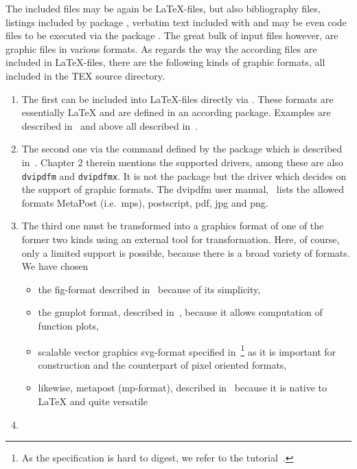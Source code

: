 The included files may be again be \LaTeX-files, but also bibliography files, 
listings included by package , verbatim text included with  
and may be even code files to be executed via the package . 
The great bulk of input files however, are graphic files in various formats. 
As regards the way the according files are included in \LaTeX-files, 
there are the following kinds of graphic formats, 
all included in the TEX source directory. 
%
\begin{enumerate}
\item
The first can be included into \LaTeX-files directly via . 
These formats are essentially \LaTeX{}
and are defined in an according package. 
Examples are  described in~\cite{EEpic}
and above all  described in~\cite{TikzPGF}. 
\item
The second one via the command  
defined by the package  
which is described in~\cite{GraX}. 
Chapter 2 therein mentions the supported drivers, 
among these are also \texttt{dvipdfm} and \texttt{dvipdfmx}. 
It is not the package but the driver 
which decides on the support of graphic formats. 
The dvipdfm user manual,~\cite{DviPdfMx} lists the allowed formats 
MetaPost (i.e.~\gls{mps}), postscript, 
\gls{pdf}, \gls{jpg} and \gls{png}. 
\item\label{it:transExp}
The third one must be transformed into a graphics format 
of one of the former two kinds using an external tool for transformation. 
Here, of course, only a limited support is possible, 
because there is a broad variety of formats. 
We have chosen
%
\begin{itemize}
\item
  the \gls{fig}-format described in~\cite{XFigF}
  because of its simplicity, 
\item
  the gnuplot format, described in~\cite{GnuPlot}, 
  because it allows computation of function plots, 
\item
  scalable vector graphics \gls{svg}-format specified in~\cite{Svg11}\footnote%
  { As the specification is hard to digest,
  we refer to the tutorial~\cite{SvgTut}. } 
  as it is important for construction and the counterpart of pixel oriented
  formats,
\item
  likewise, metapost (\gls{mp}-format),
  described in~\cite{MPost} because it is native to \LaTeX{} 
  and quite versatile 
\end{itemize}
\item\label{it:transImp}

\end{enumerate}
